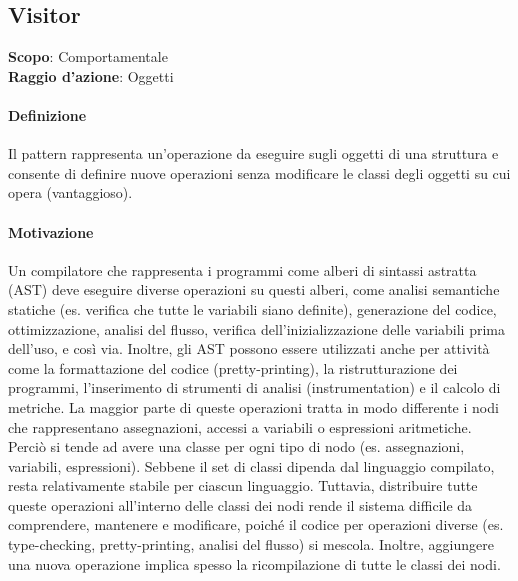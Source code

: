 \subsection{Visitor}
\label{visitor}

\textbf{Scopo}: Comportamentale \\
\textbf{Raggio d'azione}: Oggetti

\paragraph{Definizione} Il pattern rappresenta un’operazione da eseguire sugli oggetti di una struttura e consente di definire nuove operazioni senza modificare le classi degli oggetti su cui opera (vantaggioso).

\paragraph{Motivazione} Un compilatore che rappresenta i programmi come alberi di sintassi astratta (AST) deve eseguire diverse operazioni su questi alberi, come analisi semantiche statiche (es. verifica che tutte le variabili siano definite), generazione del codice, ottimizzazione, analisi del flusso, verifica dell'inizializzazione delle variabili prima dell’uso, e così via. Inoltre, gli AST possono essere utilizzati anche per attività come la formattazione del codice (pretty-printing), la ristrutturazione dei programmi, l'inserimento di strumenti di analisi (instrumentation) e il calcolo di metriche. La maggior parte di queste operazioni tratta in modo differente i nodi che rappresentano assegnazioni, accessi a variabili o espressioni aritmetiche. Perciò si tende ad avere una classe per ogni tipo di nodo (es. assegnazioni, variabili, espressioni). Sebbene il set di classi dipenda dal linguaggio compilato, resta relativamente stabile per ciascun linguaggio. Tuttavia, distribuire tutte queste operazioni all'interno delle classi dei nodi rende il sistema difficile da comprendere, mantenere e modificare, poiché il codice per operazioni diverse (es. type-checking, pretty-printing, analisi del flusso) si mescola. Inoltre, aggiungere una nuova operazione implica spesso la ricompilazione di tutte le classi dei nodi.

